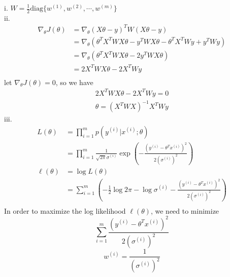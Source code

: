 \begin{answer}

    i. $W = \frac{1}{2}\text{diag}\{w^{(1)}, w^{(2)}, \cdots, w^{(m)}\}$\\
    
    ii.
    $$
    \begin{aligned}
        \nabla_\theta J(\theta) &= \nabla_\theta (X\theta - {y})^T W (X\theta - {y})\\
        &= \nabla_\theta (\theta^TX^TWX\theta  - y^TWX\theta - \theta^TX^TWy + y^TWy)\\
        &= \nabla_\theta (\theta^TX^TWX\theta  - 2y^TWX\theta)\\
        &= 2X^TWX\theta - 2X^TWy    \\
    \end{aligned}
    $$
    let $\nabla_\theta J(\theta) = 0$, so we have
    $$
    \begin{aligned}
        2X^TWX\theta - 2X^TWy = 0\\
        \theta = (X^TWX)^{-1}X^TWy
    \end{aligned}
    $$
    iii.
    $$
    \begin{aligned}
        L(\theta) &= \prod_{i = 1}^m p(y^{(i)} | x^{(i)} ; \theta)\\
        &= \prod_{i = 1}^m \frac{1}{\sqrt{2\pi}\sigma^{(i)}} \exp\left(-
        \frac{(y^{(i)} - \theta^Tx^{(i)})^2}{2(\sigma^{(i)})^2}\right)\\
        \ell(\theta) &= \log{L(\theta)} \\
        &= \sum_{i = 1}^m \left(-\frac{1}{2}\log{2\pi}-\log{\sigma^{(i)}} -
        \frac{(y^{(i)} - \theta^Tx^{(i)})^2}{2(\sigma^{(i)})^2} \right)\\
    \end{aligned}
    $$
    In order to maximize the log likelihood $\ell(\theta)$, we need to minimize
    $$
        \sum_{i = 1}^m\frac{(y^{(i)} - \theta^Tx^{(i)})^2}{2(\sigma^{(i)})^2}
    $$
    $$
        w^{(i)} = \frac{1}{(\sigma^{(i)})^2}
    $$
\end{answer}
